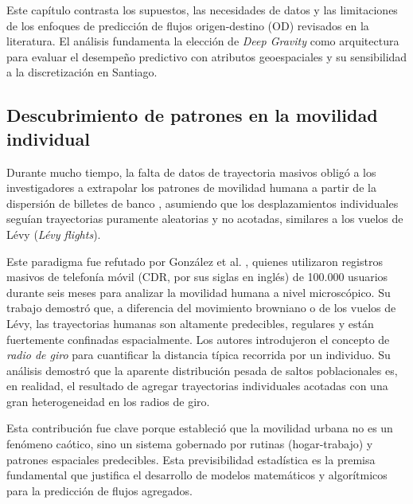 
Este capítulo contrasta los supuestos, las necesidades de datos y las limitaciones de los enfoques de predicción de flujos origen-destino (OD) revisados en la literatura. El análisis fundamenta la elección de \textit{Deep Gravity} como arquitectura para evaluar el desempeño predictivo con atributos geoespaciales y su sensibilidad a la discretización en Santiago.

\subsection{Descubrimiento de patrones en la movilidad individual}
\label{sec:patrones_movilidad}

Durante mucho tiempo, la falta de datos de trayectoria masivos obligó a los investigadores a extrapolar los patrones de movilidad humana a partir de la dispersión de billetes de banco \cite{brockmann2006scaling}, asumiendo que los desplazamientos individuales seguían trayectorias puramente aleatorias y no acotadas, similares a los vuelos de Lévy (\textit{Lévy flights}). 

Este paradigma fue refutado por Gonz\'alez et al. \cite{gonzalez2008understanding}, quienes utilizaron registros masivos de telefonía móvil (CDR, por sus siglas en inglés) de 100.000 usuarios durante seis meses para analizar la movilidad humana a nivel microscópico. Su trabajo demostró que, a diferencia del movimiento browniano o de los vuelos de Lévy, las trayectorias humanas son altamente predecibles, regulares y están fuertemente confinadas espacialmente. Los autores introdujeron el concepto de \textit{radio de giro} para cuantificar la distancia típica recorrida por un individuo. Su análisis demostró que la aparente distribución pesada de saltos poblacionales es, en realidad, el resultado de agregar trayectorias individuales acotadas con una gran heterogeneidad en los radios de giro.

Esta contribución fue clave porque estableció que la movilidad urbana no es un fenómeno caótico, sino un sistema gobernado por rutinas (hogar-trabajo) y patrones espaciales predecibles. Esta previsibilidad estadística es la premisa fundamental que justifica el desarrollo de modelos matemáticos y algorítmicos para la predicción de flujos agregados.

